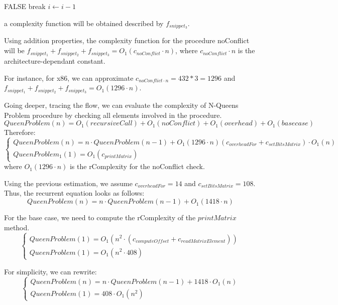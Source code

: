 \begin{algorithmic}[1]
    \State \Return FALSE
    \EndIf
    \State break
    \EndIf
    \State $i \gets i-1$
    \EndFor
\end{algorithmic}
a complexity function will be obtained described by $f_{snippet_{3}}$.

Using addition properties, the complexity function for the procedure noConflict will be $f_{snippet_{1}} + f_{snippet_{2}} + f_{snippet_{3}} = O_{1}(c_{noConflict} \cdot n)$, where $c_{noConflict} \cdot n$ is the architecture-dependant constant.

For instance, for x86, we can approximate $c_{noConflict \cdot n} = 432 * 3 = 1296$ and $f_{snippet_{1}} + f_{snippet_{2}} + f_{snippet_{3}} = O_{1}(1296 \cdot n) $.


Going deeper, tracing the flow, we can evaluate the complexity of N-Queens Problem procedure by checking all elements involved in the procedure.
\[QueenProblem(n) = O_{1}(recursiveCall) + O_{1}(noConflict) + O_{1}(overhead) + O_{1}(basecase) \]
Therefore:
\[\begin{cases}
      QueenProblem(n) = n \cdot QueenProblem(n-1) + O_{1}(1296 \cdot n) (c_{overheadFor} + c_{setBitsMatrix}) \cdot O_{1}(n) \\ QueenProblem_{1}(1)=O_{1}(c_{printMatrix})
\end{cases}\]
where $O_{1}(1296 \cdot n)$ is the rComplexity for the noConflict check.

Using the previous estimation, we assume $c_{overheadFor} = 14$ and $c_{setBitsMatrix} = 108$. Thus, the recurrent equation looks as follows:
\[QueenProblem(n) = n \cdot QueenProblem(n-1) + O_{1}(1418 \cdot n) \]

For the base case, we need to compute the rComplexity of the $printMatrix$ method.
\[ \begin{cases}
       QueenProblem(1)=O_{1}(n^{2} \cdot  (c_{computeOffset} + c_{readMatrixElement})) \\ QueenProblem(1)=O_{1}(n^{2} \cdot  408)
\end{cases}\]

For simplicity, we can rewrite:
\[ \begin{cases}
       QueenProblem(n) = n \cdot QueenProblem(n-1) + 1418 \cdot O_{1}(n) \\ QueenProblem(1)= 408 \cdot O_{1}(n^{2})
\end{cases}\]

